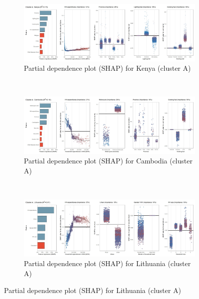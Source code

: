 \begin{figure}[ht!]\ContinuedFloat
    \centering
   \begin{subfigure}[b]{\textwidth}
         \centering
         \caption{Partial dependence plot (SHAP) for Kenya (cluster A)}
         \label{fig:5b_KEN}
         \includegraphics[width=\textwidth]{Figure 5b/Figure_5b_KEN}     
         \end{subfigure}
    \\
    \vspace{0.5cm}
   \begin{subfigure}[b]{\textwidth}        
         \centering
         \caption{Partial dependence plot (SHAP) for Cambodia (cluster A)}
         \label{fig:5b_KHM}
         \includegraphics[width=\textwidth]{Figure 5b/Figure_5b_KHM}
         \end{subfigure}
    \\
    \vspace{0.5cm}
   \begin{subfigure}[b]{\textwidth}      
         \centering
         \caption{Partial dependence plot (SHAP) for Lithuania (cluster A)}
         \label{fig:5b_LTU}
         \includegraphics[width=\textwidth]{Figure 5b/Figure_5b_LTU} 

\end{subfigure}
\end{figure}
